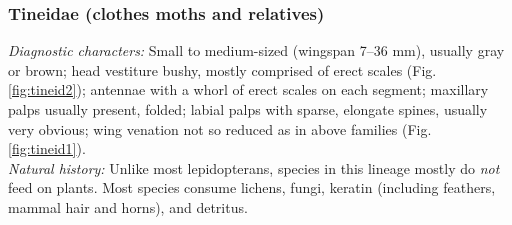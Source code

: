 \documentclass[letterpaper, 11pt]{article}
\begin{document}
\subsubsection{Tineidae (clothes moths and relatives)}
\noindent{}\textit{Diagnostic characters:} Small to medium-sized (wingspan 7--36 mm), usually gray or brown; head vestiture bushy, mostly comprised of erect scales (Fig. \ref{fig:tineid2}); antennae with a whorl of erect scales on each segment; maxillary palps usually present, folded; labial palps with sparse, elongate spines, usually very obvious; wing venation not so reduced as in above families (Fig. \ref{fig:tineid1}).\\

\noindent{}\textit{Natural history:} Unlike most lepidopterans, species in this lineage mostly do \textit{not} feed on plants. Most species consume lichens, fungi, keratin (including feathers, mammal hair and horns), and detritus.\\
\end{document}
